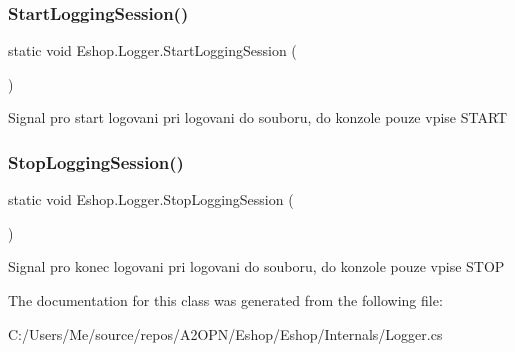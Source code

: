 \subsubsection{\texorpdfstring{StartLoggingSession()}{StartLoggingSession()}}
{\footnotesize\ttfamily static void Eshop.\+Logger.\+Start\+Logging\+Session (\begin{DoxyParamCaption}{ }\end{DoxyParamCaption})\hspace{0.3cm}{\ttfamily [static]}}



Signal pro start logovani pri logovani do souboru, do konzole pouze vpise S\+T\+A\+RT 

\mbox{\label{class_eshop_1_1_logger_a196bbedf3be2194ea2e4abf83d25fc8a}} 
\subsubsection{\texorpdfstring{StopLoggingSession()}{StopLoggingSession()}}
{\footnotesize\ttfamily static void Eshop.\+Logger.\+Stop\+Logging\+Session (\begin{DoxyParamCaption}{ }\end{DoxyParamCaption})\hspace{0.3cm}{\ttfamily [static]}}



Signal pro konec logovani pri logovani do souboru, do konzole pouze vpise S\+T\+OP 



The documentation for this class was generated from the following file\+:\begin{DoxyCompactItemize}
\item 
C\+:/\+Users/\+Me/source/repos/\+A2\+O\+P\+N/\+Eshop/\+Eshop/\+Internals/Logger.\+cs\end{DoxyCompactItemize}
